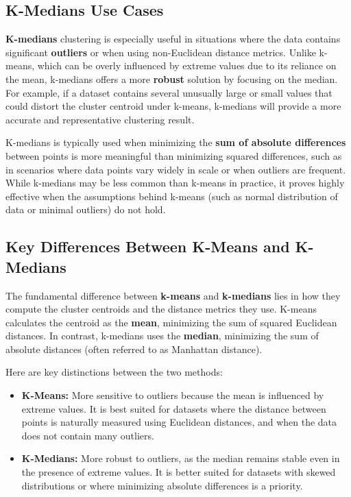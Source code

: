 \subsection{K-Medians Use Cases}
    \large \textbf{K-medians} clustering is especially useful in situations where the data contains significant \textbf{outliers} or when using non-Euclidean distance metrics. Unlike k-means, which can be overly influenced by extreme values due to its reliance on the mean, k-medians offers a more \textbf{robust} solution by focusing on the median. For example, if a dataset contains several unusually large or small values that could distort the cluster centroid under k-means, k-medians will provide a more accurate and representative clustering result.

    K-medians is typically used when minimizing the \textbf{sum of absolute differences} between points is more meaningful than minimizing squared differences, such as in scenarios where data points vary widely in scale or when outliers are frequent. While k-medians may be less common than k-means in practice, it proves highly effective when the assumptions behind k-means (such as normal distribution of data or minimal outliers) do not hold.

\subsection{Key Differences Between K-Means and K-Medians}
    \large The fundamental difference between \textbf{k-means} and \textbf{k-medians} lies in how they compute the cluster centroids and the distance metrics they use. K-means calculates the centroid as the \textbf{mean}, minimizing the sum of squared Euclidean distances. In contrast, k-medians uses the \textbf{median}, minimizing the sum of absolute distances (often referred to as Manhattan distance).

    Here are key distinctions between the two methods:
    
    \begin{itemize}
        \item \textbf{K-Means:} More sensitive to outliers because the mean is influenced by extreme values. It is best suited for datasets where the distance between points is naturally measured using Euclidean distances, and when the data does not contain many outliers.
        
        \item \textbf{K-Medians:} More robust to outliers, as the median remains stable even in the presence of extreme values. It is better suited for datasets with skewed distributions or where minimizing absolute differences is a priority.
    \end{itemize}

